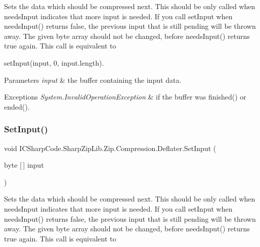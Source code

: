 Sets the data which should be compressed next. This should be only called when needs\+Input indicates that more input is needed. If you call set\+Input when needs\+Input() returns false, the previous input that is still pending will be thrown away. The given byte array should not be changed, before needs\+Input() returns true again. This call is equivalent to 

{\ttfamily set\+Input(input, 0, input.\+length)}. 


\begin{DoxyParams}{Parameters}
{\em input} & the buffer containing the input data. \\
\hline
\end{DoxyParams}

\begin{DoxyExceptions}{Exceptions}
{\em System.\+Invalid\+Operation\+Exception} & if the buffer was finished() or ended(). \\
\hline
\end{DoxyExceptions}
\mbox{\label{class_i_c_sharp_code_1_1_sharp_zip_lib_1_1_zip_1_1_compression_1_1_deflater_a47dd1a3f861adb774c5a31414ad55667}} 
\subsubsection{\texorpdfstring{Set\+Input()}{SetInput()}\hspace{0.1cm}{\footnotesize\ttfamily [2/4]}}
{\footnotesize\ttfamily void I\+C\+Sharp\+Code.\+Sharp\+Zip\+Lib.\+Zip.\+Compression.\+Deflater.\+Set\+Input (\begin{DoxyParamCaption}\item[{byte \mbox{[}$\,$\mbox{]}}]{input }\end{DoxyParamCaption})\hspace{0.3cm}{\ttfamily [inline]}}



Sets the data which should be compressed next. This should be only called when needs\+Input indicates that more input is needed. If you call set\+Input when needs\+Input() returns false, the previous input that is still pending will be thrown away. The given byte array should not be changed, before needs\+Input() returns true again. This call is equivalent to 

